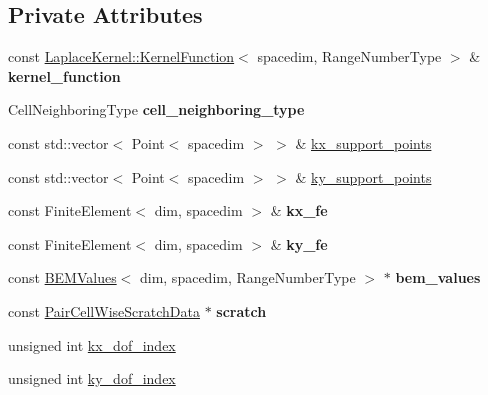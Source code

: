 \subsection*{Private Attributes}
\begin{DoxyCompactItemize}
\item 
\mbox{\label{classLaplaceBEM_1_1KernelPulledbackToUnitCell_acf7e47b2ed819a2c6f320a306a2689fe}} 
const \hyperlink{classLaplaceBEM_1_1LaplaceKernel_1_1KernelFunction}{Laplace\+Kernel\+::\+Kernel\+Function}$<$ spacedim, Range\+Number\+Type $>$ \& {\bfseries kernel\+\_\+function}
\item 
\mbox{\label{classLaplaceBEM_1_1KernelPulledbackToUnitCell_a82662fdd33ceb50cd40aaf7b2bd1b32a}} 
Cell\+Neighboring\+Type {\bfseries cell\+\_\+neighboring\+\_\+type}
\item 
const std\+::vector$<$ Point$<$ spacedim $>$ $>$ \& \hyperlink{classLaplaceBEM_1_1KernelPulledbackToUnitCell_ac7667f6cacebaed1a6ba39d67211db04}{kx\+\_\+support\+\_\+points}
\item 
const std\+::vector$<$ Point$<$ spacedim $>$ $>$ \& \hyperlink{classLaplaceBEM_1_1KernelPulledbackToUnitCell_a92971044a5f8ce2f61688858a3deac8e}{ky\+\_\+support\+\_\+points}
\item 
\mbox{\label{classLaplaceBEM_1_1KernelPulledbackToUnitCell_a0455971a463de57f21930bb134461a17}} 
const Finite\+Element$<$ dim, spacedim $>$ \& {\bfseries kx\+\_\+fe}
\item 
\mbox{\label{classLaplaceBEM_1_1KernelPulledbackToUnitCell_a664dab9bbbf454f7636c61f43b4829eb}} 
const Finite\+Element$<$ dim, spacedim $>$ \& {\bfseries ky\+\_\+fe}
\item 
\mbox{\label{classLaplaceBEM_1_1KernelPulledbackToUnitCell_a00b7c35e8a15b73113921af1eb3a3539}} 
const \hyperlink{classLaplaceBEM_1_1BEMValues}{B\+E\+M\+Values}$<$ dim, spacedim, Range\+Number\+Type $>$ $\ast$ {\bfseries bem\+\_\+values}
\item 
\mbox{\label{classLaplaceBEM_1_1KernelPulledbackToUnitCell_a39328e6d06348a2a4841f91077ea2a6c}} 
const \hyperlink{structLaplaceBEM_1_1PairCellWiseScratchData}{Pair\+Cell\+Wise\+Scratch\+Data} $\ast$ {\bfseries scratch}
\item 
unsigned int \hyperlink{classLaplaceBEM_1_1KernelPulledbackToUnitCell_a66ba57ad86025978e5e5580c822aef89}{kx\+\_\+dof\+\_\+index}
\item 
unsigned int \hyperlink{classLaplaceBEM_1_1KernelPulledbackToUnitCell_ae6f3e4bc6cf09546bf11d01812f9b692}{ky\+\_\+dof\+\_\+index}
\end{DoxyCompactItemize}


